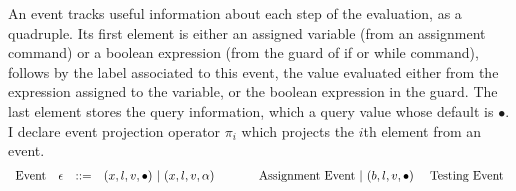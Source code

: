 An event tracks useful information about each step of the evaluation, as a quadruple. Its first element is either 
an assigned variable (from an assignment command) or a boolean expression (from the guard of if or while command), follows by 
 the label associated to this event, the value evaluated either from the expression assigned to the variable,
or the boolean expression in the guard.
 The last element stores the query information, which a query value whose default is $\bullet$. I declare event projection operator $\pi_i$ which projects the $i$th element from an event.
\[
\begin{array}{llll}
\mbox{Event} 
& \mathtt{\epsilon} & ::= & 
    ({x}, l, v, \bullet) ~|~ ({x}, l, v, \alpha)  ~~~~~~~~~~~ \mbox{Assignment Event} 
~|~(b, l, v, \bullet)   
~~~~
\mbox{Testing Event}
\end{array}
\]
% 
